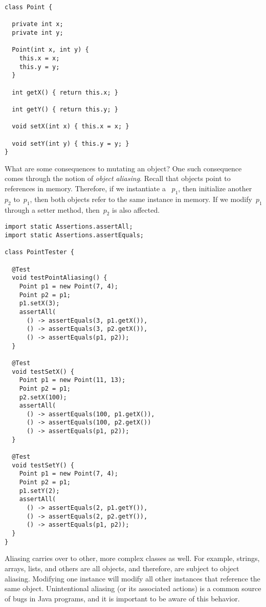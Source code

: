 \begin{lstlisting}[language=MyJava]
class Point {

  private int x;
  private int y;

  Point(int x, int y) { 
    this.x = x; 
    this.y = y; 
  }

  int getX() { return this.x; }

  int getY() { return this.y; }

  void setX(int x) { this.x = x; }

  void setY(int y) { this.y = y; }
}
\end{lstlisting}

\newpage %
What are some consequences to mutating an object? 
One such consequence comes through the notion of \emph{object aliasing}. 
Recall that objects point to references in memory. 
Therefore, if we instantiate a ~$p_1$, then initialize another ~$p_2$ to~$p_1$, then both objects refer to the same  instance in memory. 
If we modify~$p_1$ through a setter method, then~$p_2$ is also affected.

\begin{lstlisting}[language=MyJava]
import static Assertions.assertAll;
import static Assertions.assertEquals;

class PointTester {

  @Test
  void testPointAliasing() {
    Point p1 = new Point(7, 4);
    Point p2 = p1;
    p1.setX(3);
    assertAll(
      () -> assertEquals(3, p1.getX()),
      () -> assertEquals(3, p2.getX()),
      () -> assertEquals(p1, p2));
  }

  @Test
  void testSetX() {
    Point p1 = new Point(11, 13);
    Point p2 = p1;
    p2.setX(100);
    assertAll(
      () -> assertEquals(100, p1.getX()),
      () -> assertEquals(100, p2.getX())
      () -> assertEquals(p1, p2));
  }

  @Test
  void testSetY() {
    Point p1 = new Point(7, 4);
    Point p2 = p1;
    p1.setY(2);
    assertAll(
      () -> assertEquals(2, p1.getY()),
      () -> assertEquals(2, p2.getY()),
      () -> assertEquals(p1, p2));
  }
}
\end{lstlisting}

Aliasing carries over to other, more complex classes as well.
For example, strings, arrays, lists, and others are all objects, and therefore, are subject to object aliasing. 
Modifying one  instance will modify all other  instances that reference the same object. 
Unintentional aliasing (or its associated actions) is a common source of bugs in Java programs, and it is important to be aware of this behavior. 

